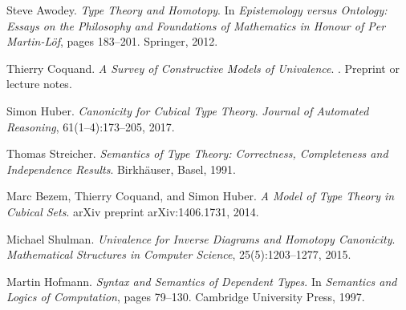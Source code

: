 \documentclass{article}
\theoremstyle{definition}
\begin{document}
\begin{thebibliography}{99}
Steve Awodey.
\newblock \emph{Type Theory and Homotopy}.
\newblock In \emph{Epistemology versus Ontology: Essays on the Philosophy and Foundations of Mathematics in Honour of Per Martin-Löf}, pages 183--201. Springer, 2012.

Thierry Coquand.
\newblock \emph{A Survey of Constructive Models of Univalence}.
. Preprint or lecture notes.

Simon Huber.
\newblock \emph{Canonicity for Cubical Type Theory}.
\newblock \emph{Journal of Automated Reasoning}, 61(1--4):173--205, 2017.

Thomas Streicher.
\newblock \emph{Semantics of Type Theory: Correctness, Completeness and Independence Results}.
\newblock Birkhäuser, Basel, 1991.

Marc Bezem, Thierry Coquand, and Simon Huber.
\newblock \emph{A Model of Type Theory in Cubical Sets}.
\newblock arXiv preprint arXiv:1406.1731, 2014.

Michael Shulman.
\newblock \emph{Univalence for Inverse Diagrams and Homotopy Canonicity}.
\newblock \emph{Mathematical Structures in Computer Science}, 25(5):1203--1277, 2015.

Martin Hofmann.
\newblock \emph{Syntax and Semantics of Dependent Types}.
\newblock In \emph{Semantics and Logics of Computation}, pages 79--130. Cambridge University Press, 1997.

\end{thebibliography}
\end{document}
